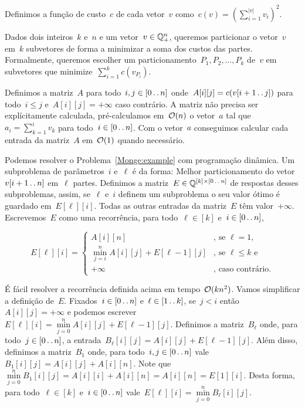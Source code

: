 \begin{prob} \label{Monge:example}
Definimos a função de custo~$c$ de cada vetor~$v$ como~$c(v) = \left( \sum\limits_{i=1}^{|v|} v_i \right)^2$.  

Dados dois inteiros~$k$ e~$n$ e um vetor~$v \in \mathbb{Q}_+^n$, queremos particionar o vetor~$v$ em~$k$ subvetores de forma a minimizar a soma dos custos das partes. Formalmente, queremos escolher um particionamento~$P_1,P_2,\dots,P_k$ de~$v$ em subvetores que minimize~$\sum \limits_{i=1}^k c(v_{P_i})$.
\end{prob}

Definimos a matriz~$A$ para todo~$i,j \in [0 \,.\,.\, n]$ onde~${A[i][j] = c(v[i+1 \,.\,.\, j])}$ para todo~$i \leq j$ e~$A[i][j] = +\infty$ caso contrário. A matriz não precisa ser explícitamente calculada, pré-calculamos em~$\mathcal{O}(n)$ o vetor~$a$ tal que~${a_i = \sum_{k=1}^i v_k}$ para todo~${i \in [0 \,.\,.\, n]}$. Com o vetor~$a$ conseguimos calcular cada entrada da matriz~$A$ em~$\mathcal{O}(1)$ quando necessário.

Podemos resolver o Problema~\ref{Monge:example} com programação dinâmica. Um subproblema de parâmetros~$i$ e~$\ell$ é da forma: Melhor particionamento do vetor~${v[i+1 \,.\,.\, n]}$ em~$\ell$ partes. Definimos a matriz~${E \in \mathbb{Q}^{[k] \times [0 \,.\,.\, n]}}$ de respostas desses subproblemas, assim, se~$\ell$ e~$i$ definem um subproblema o seu valor ótimo é guardado em~$E[\ell][i]$. Todas as outras entradas da matriz~$E$ têm valor~$+\infty$. Escrevemos~$E$ como uma recorrência, para todo~$\ell \in [k]$ e~$i \in [0 \,.\,.\, n]$,

\begin{equation*}
E[\ell][i] = \begin{cases}
    A[i][n]                                                     & \text{, se } \ell = 1 \text{, }\\
    \min\limits_{j=i}^n A[i][j] + E[\ell-1][j]                  & \text{, se } \ell \leq k \text{ e }\\
    +\infty                                                     & \text{, caso contrário.}
\end{cases}
\end{equation*}

É fácil resolver a recorrência definida acima em tempo~$\mathcal{O}(kn^2)$. Vamos simplificar a definição de~$E$. Fixados~${i \in [0 \,.\,.\, n]}$ e~${\ell \in [1 \,.\,.\, k]}$, se~$j < i$ então~${A[i][j] = +\infty}$ e podemos escrever~${E[\ell][i] = \min\limits_{j=0}^n A[i][j] + E[\ell-1][j]}$. Definimos a matriz~$B_\ell$ onde, para todo~${j \in [0 \,.\,.\, n]}$, a entrada~${B_\ell[i][j] = A[i][j] + E[\ell-1][j]}$. Além disso, definimos a matriz~$B_1$ onde, para todo~${i,j \in [0 \,.\,.\, n]}$ vale~${B_1[i][j] = A[i][j] + A[i][n]}$. Note que~${\min\limits_{j=0}^n B_1[i][j]} = {A[i][i] + A[i][n]} = {A[i][n]} = {E[1][i]}$. Desta forma, para todo~$\ell \in [k]$ e~$i \in [0 \,.\,.\, n]$ vale~${E[\ell][i] = \min\limits_{j=0}^n B_\ell[i][j]}$.

